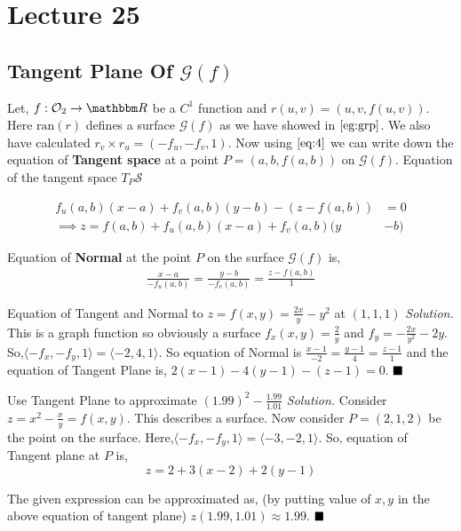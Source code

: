 \documentclass[../Analysis-3]{subfiles}
\begin{document}
\chapter*{Lecture 25} %
\setcounter{chapter}{25} %
\setcounter{section}{0}
\section{Tangent Plane Of $\mathcal{G}(f)$}

Let, $f : \mathcal{O}_2 \to \R$ be a $C^1$ function and $r(u,v) = (u,v,f(u,v))$. Here $\text{ran}(r)$ defines a surface $\mathcal{G}(f)$ as we have showed in $\ref{eg:grp}$. We also have calculated $r_v\times r_u = (-f_u,-f_v,1)$. Now using $\ref{eq:4}$ we can write down the equation of \textbf{Tangent space} at a point $P = (a,b,f(a,b))$ on $\mathcal{G}(f)$. Equation of the tangent space $T_P \mathcal{S}$

\begin{align}\label{eq:tp}
    f_u(a,b)(x-a) + f_v(a,b)(y-b)-(z-f(a,b))         & = 0 \\
    \implies z = f(a,b) + f_u(a,b)(x-a) + f_v(a,b)(y & -b)
\end{align}

Equation of \textbf{Normal} at the point $P$ on the surface $\mathcal{G}(f)$ is,
\begin{align}\label{eq:np}
    \frac{x-a}{-f_u(a,b)} = \frac{y-b}{-f_v(a,b)} = \frac{z-f(a,b)}{1}
\end{align}

\begin{Eg}{Equation of Tangent and Normal to $z = f(x,y) = \frac{2x}{y}-y^2$ at $(1,1,1)$}{}
    \textit{Solution.} This is a graph function so obviously a surface $f_x(x,y) = \frac{2}{y}$ and $f_y = -\frac{2x}{y^2} -2y$. So,$\langle -f_x,- f_y,1 \rangle = \langle -2,4,1\rangle$. So equation of Normal
    is $\frac{x-1}{-2}=\frac{y-1}{4}=\frac{z-1}{1}$ and the equation of Tangent Plane is,
    $ 2(x-1)-4(y-1) -(z-1) = 0$. $\hfill \blacksquare $
\end{Eg}
\begin{Eg}{Use Tangent Plane to approximate $(1.99)^2 - \frac{1.99}{1.01}$}{}
    \textit{Solution.} Consider $z = x^2 - \frac{x}{y} = f(x,y)$. This describes a surface. Now consider $P=(2,1,2)$ be the point on the surface. Here,$\langle -f_x,- f_y,1 \rangle = \langle -3,-2,1\rangle$. So, equation of Tangent plane at $P$ is, \[z = 2 +3(x-2) +2(y-1)\]

    The given expression can be approximated as, (by putting value of $x,y$ in the above equation of tangent plane) $z(1.99,1.01) \approx 1.99$. $\hfill \blacksquare$
\end{Eg}
\end{document}
